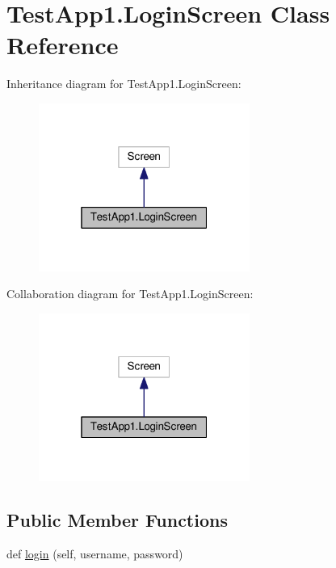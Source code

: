 \hypertarget{classTestApp1_1_1LoginScreen}{}\section{Test\+App1.\+Login\+Screen Class Reference}
\label{classTestApp1_1_1LoginScreen}


Inheritance diagram for Test\+App1.\+Login\+Screen\+:
\nopagebreak
\begin{figure}[H]
\begin{center}
\leavevmode
\includegraphics[width=196pt]{classTestApp1_1_1LoginScreen__inherit__graph}
\end{center}
\end{figure}


Collaboration diagram for Test\+App1.\+Login\+Screen\+:
\nopagebreak
\begin{figure}[H]
\begin{center}
\leavevmode
\includegraphics[width=196pt]{classTestApp1_1_1LoginScreen__coll__graph}
\end{center}
\end{figure}
\subsection*{Public Member Functions}
\begin{DoxyCompactItemize}
\item 
def \hyperlink{classTestApp1_1_1LoginScreen_a112fceb7785f8596158f842d5c223936}{login} (self, username, password)
\end{DoxyCompactItemize}
